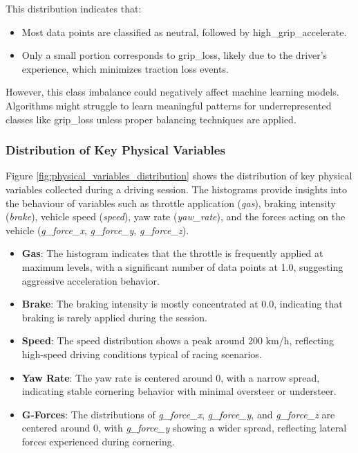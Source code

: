 \documentclass[a4paper,final,12pt]{report}
\begin{document}
This distribution indicates that:
\begin{itemize}
    \item Most data points are classified as neutral, followed by high\_grip\_accelerate.
    \item Only a small portion corresponds to grip\_loss, likely due to the driver's experience, which minimizes traction loss events.
\end{itemize}
However, this class imbalance could negatively affect machine learning models. Algorithms might struggle to learn meaningful patterns for underrepresented classes like grip\_loss unless proper balancing techniques are applied.

\subsubsection{Distribution of Key Physical Variables}
Figure \ref{fig:physical_variables_distribution} shows the distribution of key physical variables collected during a driving session. The histograms provide insights into the behaviour of variables such as throttle application (\textit{gas}), braking intensity (\textit{brake}), vehicle speed (\textit{speed}), yaw rate (\textit{yaw\_rate}), and the forces acting on the vehicle (\textit{g\_force\_x}, \textit{g\_force\_y}, \textit{g\_force\_z}).

\begin{itemize}
    \item \textbf{Gas}: The histogram indicates that the throttle is frequently applied at maximum levels, with a significant number of data points at 1.0, suggesting aggressive acceleration behavior.
    \item \textbf{Brake}: The braking intensity is mostly concentrated at 0.0, indicating that braking is rarely applied during the session.
    \item \textbf{Speed}: The speed distribution shows a peak around 200 km/h, reflecting high-speed driving conditions typical of racing scenarios.
    \item \textbf{Yaw Rate}: The yaw rate is centered around 0, with a narrow spread, indicating stable cornering behavior with minimal oversteer or understeer.
    \item \textbf{G-Forces}: The distributions of \textit{g\_force\_x}, \textit{g\_force\_y}, and \textit{g\_force\_z} are centered around 0, with \textit{g\_force\_y} showing a wider spread, reflecting lateral forces experienced during cornering.
\end{itemize}
\end{document}
